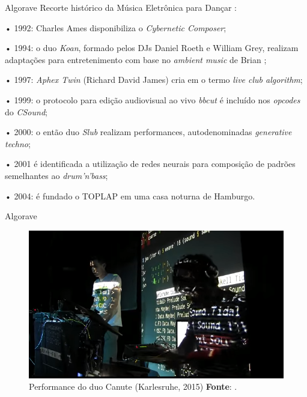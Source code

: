 \documentclass[aspectratio=169]{beamer}
\begin{document}
\begin{frame}{Algorave}
Recorte histórico da Música Eletrônica para Dançar \cite{collins_algorave_2014}:

• 1992: Charles Ames disponibiliza o \emph{Cybernetic Composer};

• 1994: o duo \emph{Koan}, formado pelos DJs Daniel Roeth e William Grey, realizam adaptações para entretenimento com base no \emph{ambient music} de Brian ;

• 1997: \emph{Aphex Twin} (Richard David James) cria em  o termo \emph{live club algorithm};

• 1999: o protocolo para edição audiovisual ao vivo \emph{bbcut} \cite{collins_bbcut_2003} é incluído nos \emph{opcodes} do \emph{CSound};

• 2000: o então duo \emph{Slub} realizam performances, autodenominadas \emph{generative techno};

• 2001 é identificada a utilização de redes neurais para composição de padrões semelhantes ao \emph{drum'n'bass};

• 2004: é fundado o TOPLAP em uma casa noturna de Hamburgo.
\end{frame}

\begin{frame}{Algorave}
\begin{figure}[!h]
  \centering
  \includegraphics[scale=0.5]{imagens/canute.png}
  \caption{Performance do duo Canute (Karlesruhe, 2015) \textbf{Fonte}: .}
  \label{fig:canute}
\end{figure}
\end{frame}
\end{document}
